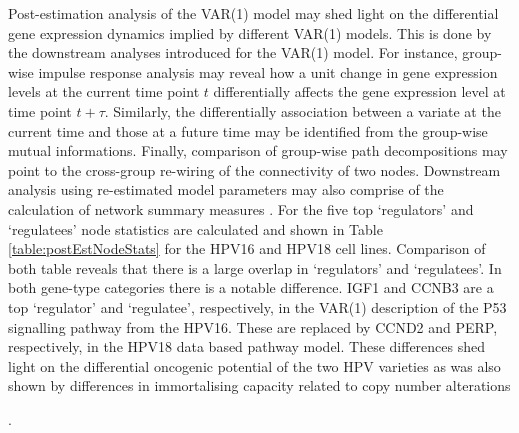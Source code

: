 Post-estimation analysis of the VAR(1) model may shed light on the differential gene expression dynamics implied by different VAR(1) models. This is done by the downstream analyses introduced for the VAR(1) model. For instance, group-wise impulse response analysis may reveal how  a unit change in gene expression levels at the current time point $t$ differentially affects the gene expression level at time point $t+\tau$. Similarly, the differentially association between a variate at the current time and those at a future time may be identified from the group-wise mutual informations. Finally, comparison of group-wise path decompositions may point to the cross-group re-wiring of the connectivity of two nodes. Downstream analysis using re-estimated model parameters may also comprise of the calculation of network summary measures \citep{Newman2010}. For the five top `regulators' and `regulatees' node statistics are calculated and shown in Table \ref{table:postEstNodeStats} for the HPV16 and HPV18  cell lines. Comparison of both table reveals that there is a large overlap in `regulators' and `regulatees'. In both gene-type categories there is a notable difference. IGF1 and CCNB3 are a top `regulator' and `regulatee', respectively, in the VAR(1) description of the P53 signalling pathway from the HPV16. These are replaced by CCND2 and PERP, respectively, in the HPV18 data based pathway model. These differences shed light on the differential oncogenic potential of the two HPV varieties as was also shown by differences in immortalising capacity related to copy number alterations {\cite{Schutze2014, Schutze2016}.


}
